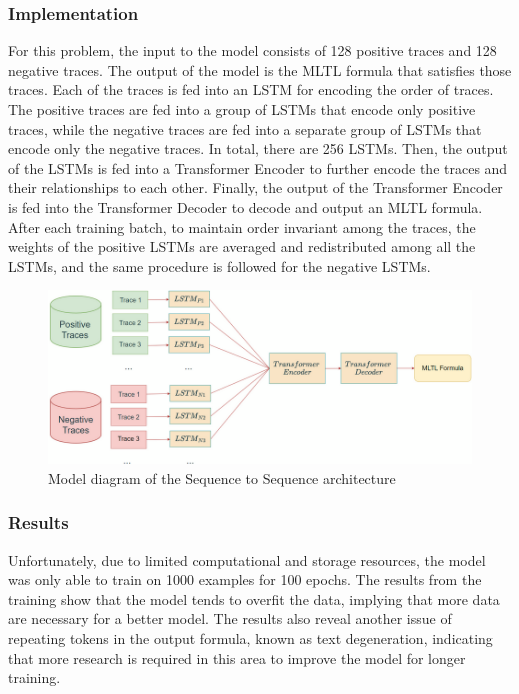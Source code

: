 \documentclass[runningheads]{llncs}
\begin{document}
\subsubsection{Implementation}
For this problem, the input to the model consists of 128 positive traces and 128 negative traces. The output of the model is the MLTL formula that satisfies those traces. Each of the traces is fed into an LSTM for encoding the order of traces. The positive traces are fed into a group of LSTMs that encode only positive traces, while the negative traces are fed into a separate group of LSTMs that encode only the negative traces. In total, there are 256 LSTMs. Then, the output of the LSTMs is fed into a Transformer Encoder to further encode the traces and their relationships to each other. Finally, the output of the Transformer Encoder is fed into the Transformer Decoder to decode and output an MLTL formula. After each training batch, to maintain order invariant among the traces, the weights of the positive LSTMs are averaged and redistributed among all the LSTMs, and the same procedure is followed for the negative LSTMs.

\begin{figure}
    \centering
    \includegraphics[width=1\linewidth]{figs/seq2seqmodel.png}
    \caption{Model diagram of the Sequence to Sequence architecture}
\end{figure}

\subsubsection{Results} Unfortunately, due to limited computational and storage resources, the model was only able to train on 1000 examples for 100 epochs. The results from the training show that the model tends to overfit the data, implying that more data are necessary for a better model. The results also reveal another issue of repeating tokens in the output formula, known as text degeneration, indicating that more research is required in this area to improve the model for longer training.
\end{document}
